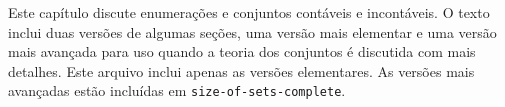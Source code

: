 \documentclass[../../../include/open-logic-chapter]{subfiles}
\begin{document}

\begin{editorial}
Este capítulo discute enumerações e conjuntos contáveis e incontáveis.
O texto inclui duas versões de algumas seções, uma versão mais elementar
e uma versão mais avançada para uso quando a teoria dos conjuntos é
discutida com mais detalhes. Este arquivo inclui apenas as versões
elementares. As versões mais avançadas estão incluídas em \verb|size-of-sets-complete|.
\end{editorial}











\OLEndChapterHook
\end{document}
